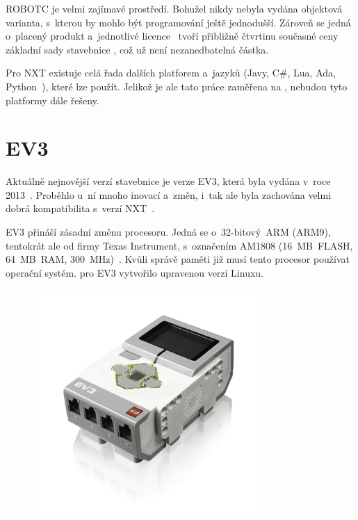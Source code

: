 ROBOTC je velmi zajímavé prostředí. Bohužel nikdy nebyla vydána objektová varianta, s~kterou by mohlo být programování ještě jednodušší. 
Zároveň se jedná o~placený produkt a~jednotlivé licence~\cite{legoProgramingPlatform_ROBOTC-price} tvoří přibližně čtvrtinu současné ceny základní sady stavebnice \legoEV{~}\cite{lego_eduxeEshop_CoreSet}, což už není nezanedbatelná částka.

Pro NXT existuje celá řada dalších platforem a~jazyků (Javy, C\#, Lua, Ada, Python~\cite{legoMindstormsNXT_Programming}), které lze použít. 
Jelikož je ale tato práce zaměřena na \legoEV{ }, nebudou tyto platformy dále řešeny. 

\section{\legoM{ }EV3}

Aktuálně nejnovější verzí stavebnice \legoM{ }je verze EV3, která byla vydána v~roce 2013~\cite{lego_mindstormsHistory}. 
Proběhlo u~ní mnoho inovací a~změn, i~tak ale byla zachována velmi dobrá kompatibilita s~verzí NXT~\cite{legoRobotSquare_EV3-and-NXT-compatibility}.

EV3 přináší zásadní změnu procesoru. 
Jedná se o~32-bitový~ARM (ARM9), tentokrát ale od firmy Texas Instrument, s~označením AM1808 (16~MB~FLASH, 64~MB~RAM, 300~MHz)~\cite{legoMindstormsEV3_fw-dev-kit}. 
Kvůli správě paměti již musí tento procesor používat operační systém. %
\lego{ }pro EV3 vytvořilo upravenou verzi Linuxu. 

\begin{figure}[h]
	\centering
	\includegraphics[width=330px]{images/lego-mindstorms-ev3_brick.jpg}
	\caption[]{\legoEV{ \brick}\protect\footnotemark}
	\label{fig:lego-mindstorms-ev3_brick}
\end{figure}

